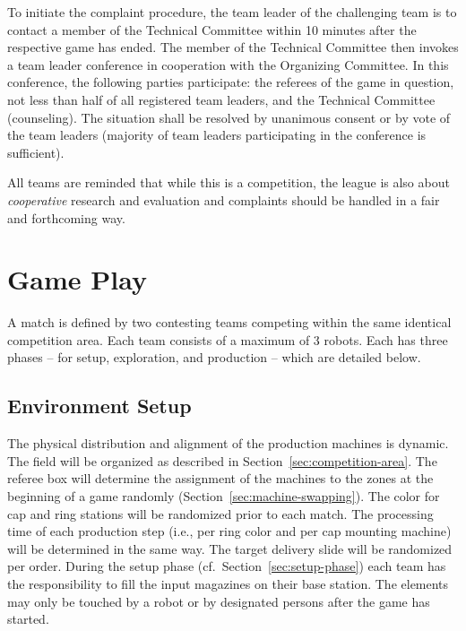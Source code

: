 \documentclass[12pt,twoside]{article}
\newcommand{\refsec}[1]{Section~\ref{#1}}
\begin{document}
To initiate the complaint procedure, the team leader of the
challenging team is to contact a member of the Technical Committee
within 10 minutes after the respective game has ended. The member of
the Technical Committee then invokes a team leader conference in
cooperation with the Organizing Committee. In this conference, the
following parties participate: the referees of the game in question,
not less than half of all registered team leaders, and the Technical
Committee (counseling). The situation shall be resolved by unanimous
consent or by vote of the team leaders (majority of team leaders
participating in the conference is sufficient).

All teams are reminded that while this is a competition, the league is
also about \emph{cooperative} research and evaluation and complaints
should be handled in a fair and forthcoming way.

\section{Game Play}
A match is defined by two contesting teams competing within the same
identical competition area. Each team consists of a maximum of 3
robots. Each has three phases -- for setup, exploration, and
production -- which are detailed below.

\subsection{Environment Setup}
\label{sec:env-setup}
The physical distribution and alignment of the production machines is
dynamic. The field will be organized as described in
\refsec{sec:competition-area}. The referee box will determine the
assignment of the machines to the zones at the beginning of a game
randomly (\refsec{sec:machine-swapping}).
The color for cap and ring stations will be
randomized prior to each match. The processing time of each production
step (i.e., per ring color and per cap mounting machine) will be
determined in the same way. The target delivery slide will be
randomized per order. During the setup phase
(cf.~\refsec{sec:setup-phase}) each team has the responsibility to
fill the input magazines on their base station. The elements may only
be touched by a robot or by designated persons after the game has
started.

\end{document}
